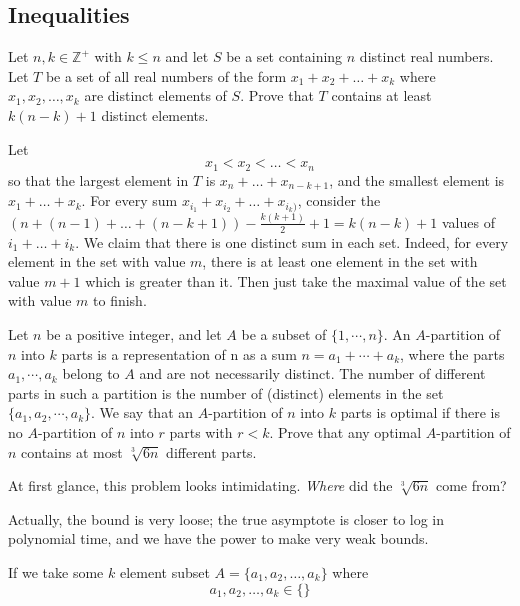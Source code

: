 \documentclass[11pt]{scrartcl}
\theoremstyle{plain} %
\theoremstyle{definition}
\theoremstyle{remark}
\theoremstyle{empty}
\theoremstyle{empty}
\theoremstyle{empty}
\theoremstyle{empty}
\theoremstyle{empty}
\theoremstyle{empty}
\begin{document}
\subsection{Inequalities}

\begin{problem}[1993 ISL C2]
Let $n,k \in \mathbb{Z}^{+}$ with $k \leq n$ and let $S$ be a set containing $n$ distinct real numbers. Let $T$ be a set of all real numbers of the form $x_1 + x_2 + \ldots + x_k$ where $x_1, x_2, \ldots, x_k$ are distinct elements of $S.$ Prove that $T$ contains at least $k(n-k)+1$ distinct elements.	
\end{problem}

\begin{solution}
    Let \[x_1 < x_2 < \ldots < x_n\] so that the largest element in $T$ is $x_n+\ldots + x_{n-k+1}$, and the smallest element is $x_1+\ldots + x_k$. For every sum $x_{i_1}+x_{i_2}+\dots + x_{i_k)}$, consider the $(n+(n-1)+\ldots + (n-k+1)) - \frac{k(k+1)}{2}+1 = k(n-k)+1$ values of $i_1+\ldots+i_k$. We claim that there is one distinct sum in each set. Indeed, for every element in the set with value $m$, there is at least one element in the set with value $m+1$ which is greater than it. Then just take the maximal value of the set with value $m$ to finish.
\end{solution}

\begin{problem}[2013 ISl C4]
Let $n$ be a positive integer, and let $A$ be a subset of $\{ 1,\cdots ,n\}$. An $A$-partition of $n$ into $k$ parts is a representation of n as a sum $n = a_1 + \cdots + a_k$, where the parts $a_1 , \cdots , a_k $ belong to $A$ and are not necessarily distinct. The number of different parts in such a partition is the number of (distinct) elements in the set $\{ a_1 , a_2 , \cdots , a_k \} $.
We say that an $A$-partition of $n$ into $k$ parts is optimal if there is no $A$-partition of $n$ into $r$ parts with $r<k$. Prove that any optimal $A$-partition of $n$ contains at most $\sqrt[3]{6n}$ different parts.
\end{problem}

\begin{solution}
At first glance, this problem looks intimidating. \textit{Where} did the $\sqrt[3]{6n}$ come from? 

Actually, the bound is very loose; the true asymptote is closer to log in polynomial time, and we have the power to make very weak bounds.

If we take some $k$ element subset $A = \{a_1,a_2,\ldots, a_k\}$ where \[a_1, a_2,\ldots, a_k \in \{\}\]
\end{solution}
\end{document}

